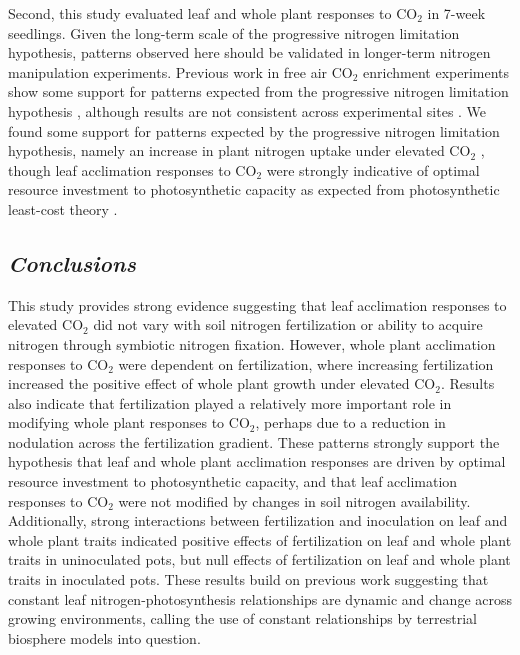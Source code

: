 Second, this study evaluated leaf and whole plant responses to CO$_2$ in 7-week seedlings. Given the long-term scale of the progressive nitrogen limitation hypothesis, patterns observed here should be validated in longer-term nitrogen manipulation experiments. Previous work in free air CO$_2$ enrichment experiments show some support for patterns expected from the progressive nitrogen limitation hypothesis , although results are not consistent across experimental sites . We found some support for patterns expected by the progressive nitrogen limitation hypothesis, namely an increase in plant nitrogen uptake under elevated CO$_2$ , though leaf acclimation responses to CO$_2$ were strongly indicative of optimal resource investment to photosynthetic capacity as expected from photosynthetic least-cost theory .

\subsection{\textit{Conclusions}}
This study provides strong evidence suggesting that leaf acclimation responses to elevated CO$_2$ did not vary with soil nitrogen fertilization or ability to acquire nitrogen through symbiotic nitrogen fixation. However, whole plant acclimation responses to CO$_2$ were dependent on fertilization, where increasing fertilization increased the positive effect of whole plant growth under elevated CO$_2$. Results also indicate that fertilization played a relatively more important role in modifying whole plant responses to CO$_2$, perhaps due to a reduction in nodulation across the fertilization gradient. These patterns strongly support the hypothesis that leaf and whole plant acclimation responses are driven by optimal resource investment to photosynthetic capacity, and that leaf acclimation responses to CO$_2$ were not modified by changes in soil nitrogen availability. Additionally, strong interactions between fertilization and inoculation on leaf and whole plant traits indicated positive effects of fertilization on leaf and whole plant traits in uninoculated pots, but null effects of fertilization on leaf and whole plant traits in inoculated pots. These results build on previous work suggesting that constant leaf nitrogen-photosynthesis relationships are dynamic and change across growing environments, calling the use of constant relationships by terrestrial biosphere models into question.
